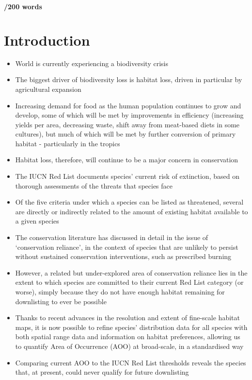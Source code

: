 \documentclass[
  12pt,
  british,
  a4paper,
]{article}
\providecommand{\tightlist}{%
  \setlength{\itemsep}{0pt}\setlength{\parskip}{0pt}}
\begin{document}
\textbf{/200 words}

\hypertarget{introduction}{%
\section{Introduction}\label{introduction}}

\begin{itemize}
\tightlist
\item
  World is currently experiencing a biodiversity crisis
\item
  The biggest driver of biodiversity loss is habitat loss, driven in particular by agricultural expansion
\item
  Increasing demand for food as the human population continues to grow and develop, some of which will be met by improvements in efficiency (increasing yields per area, decreasing waste, shift away from meat-based diets in some cultures), but much of which will be met by further conversion of primary habitat - particularly in the tropics
\item
  Habitat loss, therefore, will continue to be a major concern in conservation
\item
  The IUCN Red List documents species' current risk of extinction, based on thorough assessments of the threats that species face
\item
  Of the five criteria under which a species can be listed as threatened, several are directly or indirectly related to the amount of existing habitat available to a given species
\item
  The conservation literature has discussed in detail in the issue of `conservation reliance', in the context of species that are unlikely to persist without sustained conservation interventions, such as prescribed burning
\item
  However, a related but under-explored area of conservation reliance lies in the extent to which species are committed to their current Red List category (or worse), simply because they do not have enough habitat remaining for downlisting to ever be possible
\item
  Thanks to recent advances in the resolution and extent of fine-scale habitat maps, it is now possible to refine species' distribution data for all species with both spatial range data and information on habitat preferences, allowing us to quantify Area of Occurrence (AOO) at broad-scale, in a standardised way
\item
  Comparing current AOO to the IUCN Red List thresholds reveals the species that, at present, could never qualify for future downlisting

\end{itemize}
\end{document}
